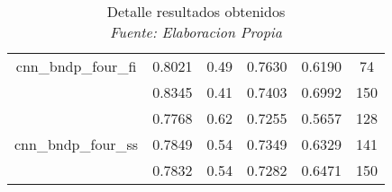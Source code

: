 \begin{table}[!ht]
\begin{tabular}{|c|c|c|c|c|c|}
		cnn\_bndp\_four\_fi & 0.8021 & 0.49 & 0.7630 & 0.6190 & 74 \\ \cline{2-6}
		~ & 0.8345 & 0.41 & 0.7403 & 0.6992 & 150 \\ \hline
		~ & 0.7768 & 0.62 & 0.7255 & 0.5657 & 128 \\ \cline{2-6}
		cnn\_bndp\_four\_ss & 0.7849 & 0.54 & 0.7349 & 0.6329 & 141 \\ \cline{2-6}
		~ & 0.7832 & 0.54 & 0.7282 & 0.6471 & 150 \\ \hline
	\end{tabular}
	\caption{Detalle resultados obtenidos
		\\\textit{Fuente: Elaboracion Propia}}
	\label{tbl:10}
\end{table}
